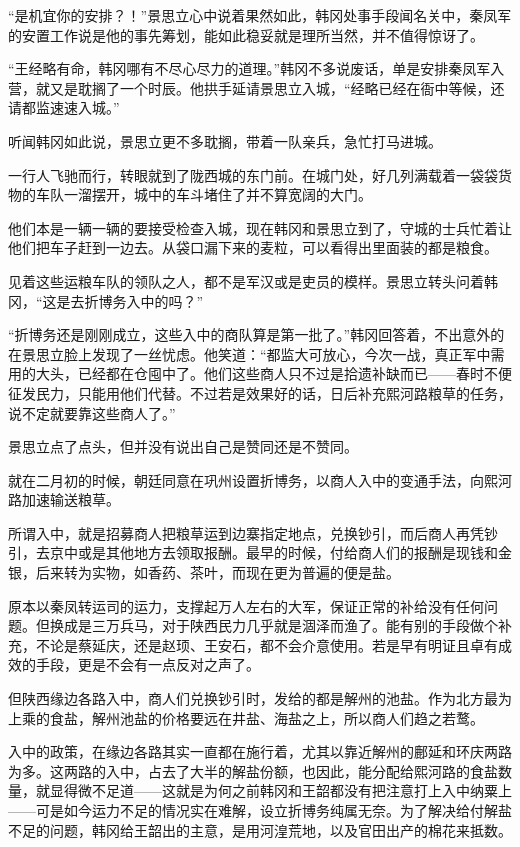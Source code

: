 “是机宜你的安排？！”景思立心中说着果然如此，韩冈处事手段闻名关中，秦凤军的安置工作说是他的事先筹划，能如此稳妥就是理所当然，并不值得惊讶了。

“王经略有命，韩冈哪有不尽心尽力的道理。”韩冈不多说废话，单是安排秦凤军入营，就又是耽搁了一个时辰。他拱手延请景思立入城，“经略已经在衙中等候，还请都监速速入城。”

听闻韩冈如此说，景思立更不多耽搁，带着一队亲兵，急忙打马进城。

一行人飞驰而行，转眼就到了陇西城的东门前。在城门处，好几列满载着一袋袋货物的车队一溜摆开，城中的车斗堵住了并不算宽阔的大门。

他们本是一辆一辆的要接受检查入城，现在韩冈和景思立到了，守城的士兵忙着让他们把车子赶到一边去。从袋口漏下来的麦粒，可以看得出里面装的都是粮食。

见着这些运粮车队的领队之人，都不是军汉或是吏员的模样。景思立转头问着韩冈，“这是去折博务入中的吗？”

“折博务还是刚刚成立，这些入中的商队算是第一批了。”韩冈回答着，不出意外的在景思立脸上发现了一丝忧虑。他笑道：“都监大可放心，今次一战，真正军中需用的大头，已经都在仓囤中了。他们这些商人只不过是拾遗补缺而已——春时不便征发民力，只能用他们代替。不过若是效果好的话，日后补充熙河路粮草的任务，说不定就要靠这些商人了。”

景思立点了点头，但并没有说出自己是赞同还是不赞同。

就在二月初的时候，朝廷同意在巩州设置折博务，以商人入中的变通手法，向熙河路加速输送粮草。

所谓入中，就是招募商人把粮草运到边寨指定地点，兑换钞引，而后商人再凭钞引，去京中或是其他地方去领取报酬。最早的时候，付给商人们的报酬是现钱和金银，后来转为实物，如香药、茶叶，而现在更为普遍的便是盐。

原本以秦凤转运司的运力，支撑起万人左右的大军，保证正常的补给没有任何问题。但换成是三万兵马，对于陕西民力几乎就是涸泽而渔了。能有别的手段做个补充，不论是蔡延庆，还是赵顼、王安石，都不会介意使用。若是早有明证且卓有成效的手段，更是不会有一点反对之声了。

但陕西缘边各路入中，商人们兑换钞引时，发给的都是解州的池盐。作为北方最为上乘的食盐，解州池盐的价格要远在井盐、海盐之上，所以商人们趋之若鹜。

入中的政策，在缘边各路其实一直都在施行着，尤其以靠近解州的鄜延和环庆两路为多。这两路的入中，占去了大半的解盐份额，也因此，能分配给熙河路的食盐数量，就显得微不足道——这就是为何之前韩冈和王韶都没有把注意打上入中纳粟上——可是如今运力不足的情况实在难解，设立折博务纯属无奈。为了解决给付解盐不足的问题，韩冈给王韶出的主意，是用河湟荒地，以及官田出产的棉花来抵数。

